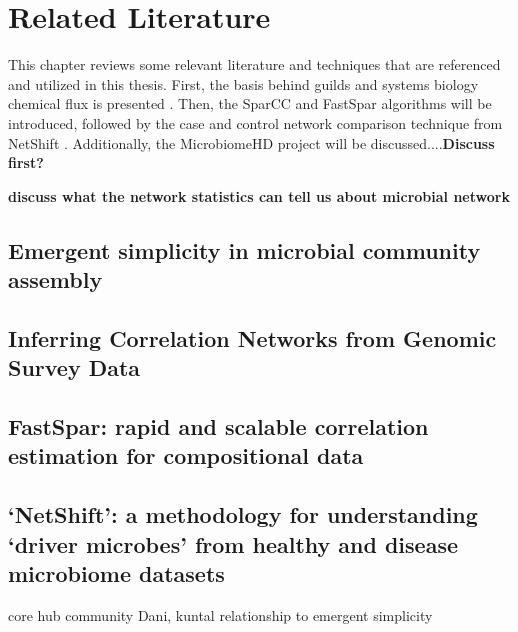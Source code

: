 \chapter{Related Literature}

This chapter reviews some relevant literature and techniques that are referenced and utilized in this thesis. First, the basis behind guilds \citep{Goldford2018} and systems biology chemical flux is presented .  Then, the SparCC \citep{Friedman2012} and FastSpar \citep{Watts2018} algorithms will be introduced, followed by the case and control network comparison technique from NetShift \citep{Kuntal2018}. Additionally, the MicrobiomeHD project \citep{Duvallet2017} will be discussed....\textbf{Discuss first?} 

\textbf{discuss what the network statistics can tell us about microbial network}

\section{Emergent simplicity in microbial community assembly}\label{lit-gold}
\section{Inferring Correlation Networks from Genomic Survey Data} \label{lit-sparcc}
\section{FastSpar: rapid and scalable correlation estimation for compositional data} \label{lit-fastspar}
\section{‘NetShift’: a methodology for understanding ‘driver microbes’ from healthy and disease microbiome datasets}\label{lit-netshift}
core hub community Dani, kuntal relationship to emergent simplicity